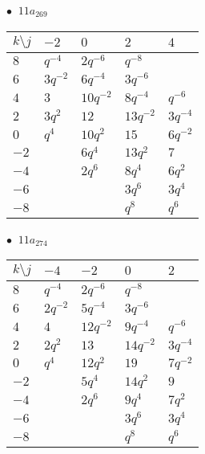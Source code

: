\begin{minipage}{\linewidth}
$\bullet\ $ $11a_{269}$ \vspace{0.5em} \\
\begin{tabular}{l|llll}
$k \setminus j$ & $-2$ & $0$ & $2$ & $4$ \\
\hline
$8$ & $q^{-4}$ & $2q^{-6}$ & $q^{-8}$ &  \\
$6$ & $3q^{-2}$ & $6q^{-4}$ & $3q^{-6}$ &  \\
$4$ & $3$ & $10q^{-2}$ & $8q^{-4}$ & $q^{-6}$ \\
$2$ & $3q^{2}$ & $12$ & $13q^{-2}$ & $3q^{-4}$ \\
$0$ & $q^{4}$ & $10q^{2}$ & $15$ & $6q^{-2}$ \\
$-2$ &  & $6q^{4}$ & $13q^{2}$ & $7$ \\
$-4$ &  & $2q^{6}$ & $8q^{4}$ & $6q^{2}$ \\
$-6$ &  &  & $3q^{6}$ & $3q^{4}$ \\
$-8$ &  &  & $q^{8}$ & $q^{6}$ \\
\end{tabular}
\vspace{2em}
\end{minipage}
%
\begin{minipage}{\linewidth}
$\bullet\ $ $11a_{274}$ \vspace{0.5em} \\
\begin{tabular}{l|llll}
$k \setminus j$ & $-4$ & $-2$ & $0$ & $2$ \\
\hline
$8$ & $q^{-4}$ & $2q^{-6}$ & $q^{-8}$ &  \\
$6$ & $2q^{-2}$ & $5q^{-4}$ & $3q^{-6}$ &  \\
$4$ & $4$ & $12q^{-2}$ & $9q^{-4}$ & $q^{-6}$ \\
$2$ & $2q^{2}$ & $13$ & $14q^{-2}$ & $3q^{-4}$ \\
$0$ & $q^{4}$ & $12q^{2}$ & $19$ & $7q^{-2}$ \\
$-2$ &  & $5q^{4}$ & $14q^{2}$ & $9$ \\
$-4$ &  & $2q^{6}$ & $9q^{4}$ & $7q^{2}$ \\
$-6$ &  &  & $3q^{6}$ & $3q^{4}$ \\
$-8$ &  &  & $q^{8}$ & $q^{6}$ \\
\end{tabular}
\vspace{2em}
\end{minipage}
%

